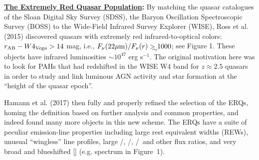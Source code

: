 \smallskip
\smallskip
\noindent
{\bf \underline{The Extremely Red Quasar Population}:} By matching the
quasar catalogues of the Sloan Digital Sky Survey (SDSS), the Baryon
Oscillation Spectroscopic Survey (BOSS) to the Wide-Field Infrared
Survey Explorer (WISE), Ross et al. (2015) discovered quasars with
extremely red infrared-to-optical colors: $r_{\rm AB}-W4_{\rm
Vega}>14$ mag, i.e., $F_\nu({\rm 22\mu m})/F_\nu(r) \gtrsim 1000$; see
Figure 1. These objects have infrared luminosities $\sim 10^{47}$ erg
s$^{-1}$.  The original motivation here was to look for PAHs that had
redshifted in the WISE W4 band for $z\approx2.5$ quasars in order to
study and link luminous AGN activity and star formation at the
``height of the quasar epoch''.

\smallskip
\smallskip
\noindent
Hamann et al. (2017) then fully and properly refined the selection of
the ERQs, homing the definition based on further analysis and common
properties, and indeed found many more objects in this new scheme. The
ERQs have a suite of peculiar emission-line properties including large
rest equivalent widths (REWs), unusual ``wingless'' line profiles,
large \nv /\lya , \nv /\civ , \siiv /\civ\ and other flux ratios, and
very broad and blueshifted [\oiii ]  (e.g. spectrum in
Figure~1).


